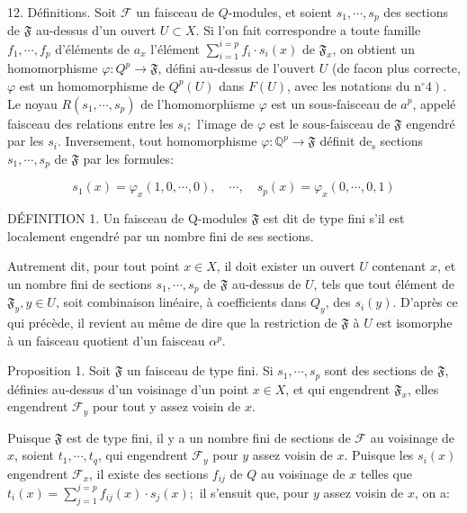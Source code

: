 12. Définitions. Soit $\mathcal{F}$ un faisceau de $Q$-modules, et soient $s_{1}, \cdots, s_{p}$ des sections de $\mathfrak{F}$ au-dessus d'un ouvert $U \subset X .$ Si l'on fait correspondre a toute famille $f_{1}, \cdots, f_{p}$ d'éléments de $a_{x}$ l'élément $\sum_{i=1}^{i=p} f_{i} \cdot s_{i}(x)$ de $\mathfrak{F}_{x}$, on obtient un homomorphisme $\varphi: Q^{p} \rightarrow \mathfrak{F}$, défini au-dessus de l'ouvert $U$ (de facon plus correcte, $\varphi$ est un homomorphisme de $Q^{p}(U)$ dans $F(U)$, avec les notations du $\left.\mathrm{n}^{\circ} 4\right)$. Le noyau $R\left(s_{1}, \cdots, s_{p}\right)$ de l'homomorphisme $\varphi$ est un sous-faisceau de $a^{p}$, appelé faisceau des relations entre les $s_{i} ;$ l'image de $\varphi$ est le sous-faisceau de $\mathfrak{F}$ engendré par les $s_{i}$. Inversement, tout homomorphisme $\varphi: \mathbb{Q}^{p} \rightarrow \mathfrak{F}$ définit $\mathrm{de}_{\mathrm{s}}$ sections $s_{1}, \cdots, s_{p}$ de $\mathfrak{F}$ par les formules:

$$
s_{1}(x)=\varphi_{x}(1,0, \cdots, 0), \quad \cdots, \quad s_{p}(x)=\varphi_{x}(0, \cdots, 0,1)
$$

DÉFINITION 1. Un faisceau de Q-modules $\mathfrak{F}$ est dit de type fini s'il est localement engendré par un nombre fini de ses sections.

Autrement dit, pour tout point $x \in X$, il doit exister un ouvert $U$ contenant $x$, et un nombre fini de sections $s_{1}, \cdots, s_{p}$ de $\mathfrak{F}$ au-dessus de $U$, tels que tout élément de $\mathfrak{F}_{y}, y \in U$, soit combinaison linéaire, à coefficients dans $Q_{y}$, des $s_{i}(y) .$ D'après ce qui précède, il revient au même de dire que la restriction de $\mathfrak{F}$ à $U$ est isomorphe à un faisceau quotient d'un faisceau $\alpha^{p}$.

Proposition 1. Soit $\mathfrak{F}$ un faisceau de type fini. Si $s_{1}, \cdots, s_{p}$ sont des sections de $\mathfrak{F}$, définies au-dessus d'un voisinage d'un point $x \in X$, et qui engendrent $\mathfrak{F}_{x}$, elles engendrent $\mathcal{F}_{y}$ pour tout y assez voisin de $x$.

Puisque $\mathfrak{F}$ est de type fini, il y a un nombre fini de sections de $\mathcal{F}$ au voisinage de $x$, soient $t_{1}, \cdots, t_{q}$, qui engendrent $\mathcal{F}_{y}$ pour $y$ assez voisin de $x$. Puisque les $s_{i}(x)$ engendrent $\mathcal{F}_{x}$, il existe des sections $f_{i j}$ de $Q$ au voisinage de $x$ telles que $t_{i}(x)=\sum_{j=1}^{j=p} f_{i j}(x) \cdot s_{j}(x) ;$ il s'ensuit que, pour $y$ assez voisin de $x$, on a:

